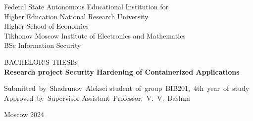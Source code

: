 \begin{titlepage}

	{
		\begin{center}
			Federal State Autonomous Educational Institution for \\
			Higher Education National Research University \\
			Higher School of Economics \\
			\medskip
			Tikhonov Moscow Institute of Electronics and Mathematics \\
			\medskip
			BSc Information Security \\
		\end{center}
	}

	\vfill

	\begin{center}
		{\large BACHELOR'S THESIS} \\
		{\bf Research project
		\linebreak
		Security Hardening of Containerized Applications}
	\end{center}

	\vfill
	\vfill
	\vfill

	\hfill\vbox
	{
		\hbox{Submitted by Shadrunov Aleksei}
		\hbox{student of group BIB201, 4th year of study}
		\hbox{}
		\hbox{Approved by Supervisor}
		\hbox{Assistant Professor, V. V. Bashun}
	}

	\vspace{\fill}

	\begin{center}
		Moscow 2024
	\end{center}

\end{titlepage}